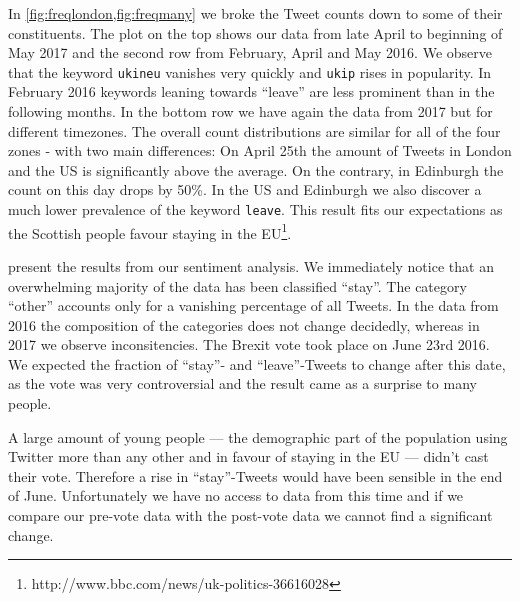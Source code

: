 \documentclass{emulateapj}
\makeatletter
\newcommand\footnoteref[1]{\protected@xdef\@thefnmark{\ref{#1}}\@footnotemark}
\makeatother
\begin{document}
In \cref{fig:freqlondon,fig:freqmany} we broke the Tweet counts down to some of their constituents. 
The plot on the top shows our data from late April to beginning of May 2017 and the second row from February, April and May 2016.
We observe that the keyword \texttt{ukineu} vanishes very quickly and \texttt{ukip} rises in popularity.
In February 2016 keywords leaning towards ``leave'' are less prominent than in the following months.
In the bottom row we have again the data from 2017 but for different timezones.
The overall count distributions are similar for all of the four zones - with two main differences:
On April 25th the amount of Tweets in London and the US is significantly above the average. 
On the contrary, in Edinburgh the count on this day drops by 50\%.
In the US and Edinburgh we also discover a much lower prevalence of the keyword \texttt{leave}.
This result fits our expectations as the Scottish people favour staying in the EU\footnote{\label{bbc}http://www.bbc.com/news/uk-politics-36616028}.

 present the results from our sentiment analysis. 
We immediately notice that an overwhelming majority of the data has been classified ``stay''.
The category ``other'' accounts only for a vanishing percentage of all Tweets.
In the data from 2016 the composition of the categories does not change decidedly, whereas in 2017
we observe inconsitencies.
The Brexit vote took place on June 23rd 2016. We expected the fraction of ``stay''- and ``leave''-Tweets to change after this date,
as the vote was very controversial and the result came as a surprise to many people. 

A large amount of young people --- the demographic part of the population using Twitter more than any other and in favour of staying in the EU --- 
didn't cast their vote\footnoteref{bbc}.
Therefore a rise in ``stay''-Tweets would have been sensible in the end of June.
Unfortunately we have no access to data from this time and if we compare our pre-vote data with the post-vote data we cannot find a significant change.



\clearpage
\end{document}

